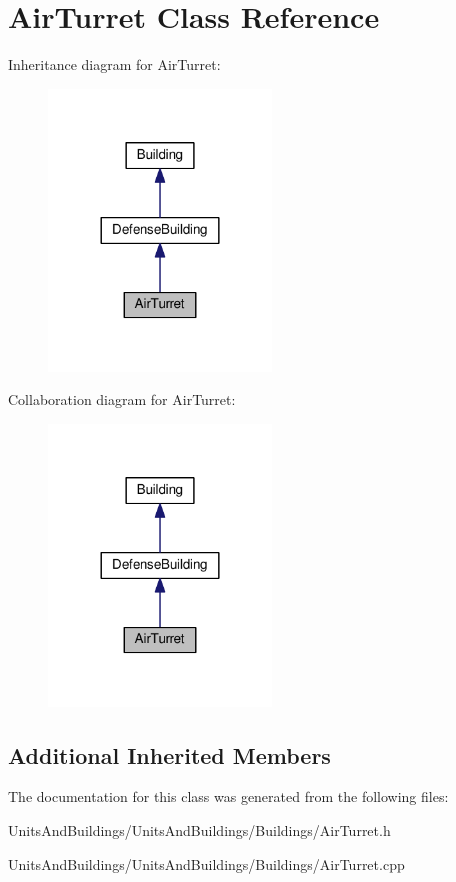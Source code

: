 \hypertarget{class_air_turret}{}\section{Air\+Turret Class Reference}
\label{class_air_turret}


Inheritance diagram for Air\+Turret\+:
\nopagebreak
\begin{figure}[H]
\begin{center}
\leavevmode
\includegraphics[width=168pt]{class_air_turret__inherit__graph}
\end{center}
\end{figure}


Collaboration diagram for Air\+Turret\+:
\nopagebreak
\begin{figure}[H]
\begin{center}
\leavevmode
\includegraphics[width=168pt]{class_air_turret__coll__graph}
\end{center}
\end{figure}
\subsection*{Additional Inherited Members}


The documentation for this class was generated from the following files\+:\begin{DoxyCompactItemize}
\item 
Units\+And\+Buildings/\+Units\+And\+Buildings/\+Buildings/Air\+Turret.\+h\item 
Units\+And\+Buildings/\+Units\+And\+Buildings/\+Buildings/Air\+Turret.\+cpp\end{DoxyCompactItemize}
